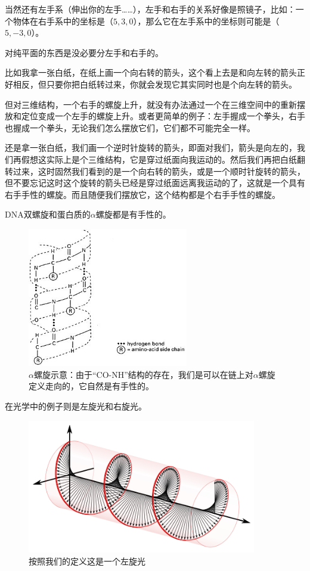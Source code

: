 当然还有左手系（伸出你的左手……），左手和右手的关系好像是照镜子，比如：一个物体在右手系中的坐标是（$5, 3, 0$），那么它在左手系中的坐标则可能是（$5, -3, 0$）。

对纯平面的东西是没必要分左手和右手的。

比如我拿一张白纸，在纸上画一个向右转的箭头，这个看上去是和向左转的箭头正好相反，但只要你把白纸转过来，你就会发现它其实同时也是个向左转的箭头。

但对三维结构，一个右手的螺旋上升，就没有办法通过一个在三维空间中的重新摆放和定位变成一个左手的螺旋上升。或者更简单的例子：左手握成一个拳头，右手也握成一个拳头，无论我们怎么摆放它们，它们都不可能完全一样。

还是拿一张白纸，我们画一个逆时针旋转的箭头，即面对我们，箭头是向左的，我们再假想这实际上是个三维结构，它是穿过纸面向我运动的。然后我们再把白纸翻转过来，这时固然我们看到的是一个向右转的箭头，或是一个顺时针旋转的箭头，但不要忘记这时这个旋转的箭头已经是穿过纸面远离我运动的了，这就是一个具有右手手性的螺旋。而且随便我们摆放它，这个结构都是个右手手性的螺旋。

DNA双螺旋和蛋白质的$\alpha$螺旋都是有手性的。

\begin{figure}[htbp]
\begin{center}
\includegraphics[width=7cm]{Preface/alphahelix.jpg}
\caption{$\alpha$螺旋示意：由于“CO-NH”结构的存在，我们是可以在链上对$\alpha$螺旋定义走向的，它自然是有手性的。}
\end{center}
\end{figure}


在光学中的例子则是左旋光和右旋光。

\begin{figure}[htbp]
\begin{center}
\includegraphics[width=10cm]{Preface/circularpolarization.png}
\caption{按照我们的定义这是一个左旋光}
\label{default}
\end{center}
\end{figure}



